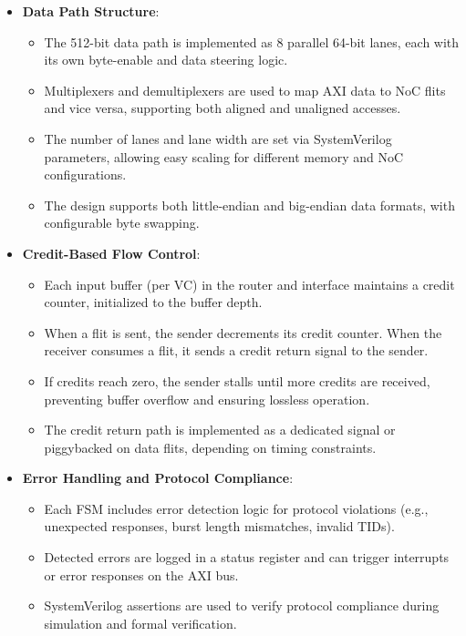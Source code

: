 \documentclass[11pt,a4paper]{article}
\begin{document}
\begin{itemize}
\begin{itemize}
    \end{itemize}
    \item \textbf{Data Path Structure}:
    \begin{itemize}
        \item The 512-bit data path is implemented as 8 parallel 64-bit lanes, each with its own byte-enable and data steering logic.
        \item Multiplexers and demultiplexers are used to map AXI data to NoC flits and vice versa, supporting both aligned and unaligned accesses.
        \item The number of lanes and lane width are set via SystemVerilog parameters, allowing easy scaling for different memory and NoC configurations.
        \item The design supports both little-endian and big-endian data formats, with configurable byte swapping.
    \end{itemize}
    \item \textbf{Credit-Based Flow Control}:
    \begin{itemize}
        \item Each input buffer (per VC) in the router and interface maintains a credit counter, initialized to the buffer depth.
        \item When a flit is sent, the sender decrements its credit counter. When the receiver consumes a flit, it sends a credit return signal to the sender.
        \item If credits reach zero, the sender stalls until more credits are received, preventing buffer overflow and ensuring lossless operation.
        \item The credit return path is implemented as a dedicated signal or piggybacked on data flits, depending on timing constraints.
    \end{itemize}
    \item \textbf{Error Handling and Protocol Compliance}:
    \begin{itemize}
        \item Each FSM includes error detection logic for protocol violations (e.g., unexpected responses, burst length mismatches, invalid TIDs).
        \item Detected errors are logged in a status register and can trigger interrupts or error responses on the AXI bus.
        \item SystemVerilog assertions are used to verify protocol compliance during simulation and formal verification.
    \end{itemize}
\end{itemize}
\end{document}
